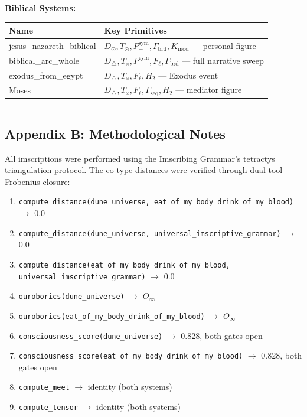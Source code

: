 \documentclass[12pt,a4paper]{article}
\begin{document}
\textbf{Biblical Systems:}

\begin{table}[htbp]
\centering
\small
{}
\begin{tabularx}{\textwidth}{>{\centering\arraybackslash}X >{\centering\arraybackslash}X}
\toprule
\rowcolor{gray!25}\textbf{Name} & \textbf{Key Primitives} \\
\midrule
\rowcolors{1}{white}{gray!10}
jesus\_nazareth\_biblical & $D_{\odot}, T_{\odot}, P_{\pm}^{\text{sym}}, \Gamma_{\text{brd}}, K_{\text{mod}}$ --- personal figure \\
biblical\_arc\_whole & $D_{\triangle}, T_{\bowtie}, P_{\pm}^{\text{sym}}, F_{\ell}, \Gamma_{\text{brd}}$ --- full narrative sweep \\
exodus\_from\_egypt & $D_{\triangle}, T_{\bowtie}, F_{\ell}, H_2$ --- Exodus event \\
Moses & $D_{\triangle}, T_{\bowtie}, F_{\ell}, \Gamma_{\text{seq}}, H_2$ --- mediator figure \\
\bottomrule
\end{tabularx}
\end{table}

\begin{center}
\rule{0.5\textwidth}{0.4pt}
\end{center}

\subsection{Appendix B: Methodological Notes}

All imscriptions were performed using the Imscribing Grammar's tetractys triangulation protocol. The co-type distances were verified through dual-tool Frobenius closure:

\begin{enumerate}
    \item \texttt{compute\_distance(dune\_universe, eat\_of\_my\_body\_drink\_of\_my\_blood)} $\rightarrow$ 0.0
    \item \texttt{compute\_distance(dune\_universe, universal\_imscriptive\_grammar)} $\rightarrow$ 0.0
    \item \texttt{compute\_distance(eat\_of\_my\_body\_drink\_of\_my\_blood, universal\_imscriptive\_grammar)} $\rightarrow$ 0.0
    \item \texttt{ouroborics(dune\_universe)} $\rightarrow$ $O_{\infty}$
    \item \texttt{ouroborics(eat\_of\_my\_body\_drink\_of\_my\_blood)} $\rightarrow$ $O_{\infty}$
    \item \texttt{consciousness\_score(dune\_universe)} $\rightarrow$ 0.828, both gates open
    \item \texttt{consciousness\_score(eat\_of\_my\_body\_drink\_of\_my\_blood)} $\rightarrow$ 0.828, both gates open
    \item \texttt{compute\_meet} $\rightarrow$ identity (both systems)
    \item \texttt{compute\_tensor} $\rightarrow$ identity (both systems)
\end{enumerate}
\end{document}
